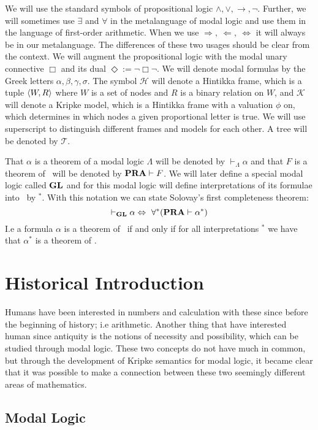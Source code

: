 \documentclass[../main.tex]{subfiles}
\begin{document}
We will use the standard symbols of propositional  logic
$\wedge,\vee,\rightarrow,\neg$. Further, we will sometimes use $\exists$ and
$\forall$ in the metalanguage of modal logic and use them in the language of
first-order arithmetic. When we use $\Rightarrow,\ \Leftarrow, \
\Leftrightarrow$ it will always be in our metalanguage. The differences of these two usages should be clear
from the context. We will augment the propositional logic with the modal unary
connective $\Box$ and its dual $\Diamond:=\neg\Box\neg$. We will denote modal
formulas by the Greek letters $\alpha,\beta,\gamma,\sigma$. The symbol
$\mathcal{H}$ will denote a
Hintikka frame,  which is a tuple $\langle W,R\rangle$ where $W$ is a set of nodes and
$R$ is a binary relation on $W$, and
$\mathcal{K}$ will denote a Kripke model, which is a Hintikka frame with a
valuation $\phi$ on, which determines in which nodes a given proportional letter
is true. We will use superscript to distinguish different frames
and models for each other.
A tree will be denoted by $\mathcal{T}$.

That $\alpha$ is a theorem of a modal logic $\Lambda$ will be denoted by
$\vdash_\Lambda\alpha$ and that $F$ is a theorem of \PRA\ will be denoted by
$\text{\textbf{PRA}}\vdash F$. We will later define a special modal logic called $\text{\textbf{GL}}$ and for
this modal logic will define interpretations of its formulae into \PRA\ by
$^*$. With this notation we can state Solovay's first completeness theorem:
\[\vdash_{\text{\textbf{GL}}}\alpha\Leftrightarrow\ \forall ^*(\text{\textbf{PRA}}\vdash\alpha^*)\]
I.e a formula $\alpha$ is a theorem of \GL\ if and only if for all
interpretations $^*$ we have that $\alpha^*$ is a theorem of \PRA.

\section{Historical Introduction}
Humans have been interested in numbers and calculation with these since before
the beginning of history; i.e arithmetic. Another thing that have interested
human since antiquity is the notions of necessity and possibility, which can be
studied through modal logic. These two
concepts do not have much in common, but through the development of Kripke
semantics for modal logic, it became clear that it was possible to make a
connection between these two seemingly different areas of mathematics.

\subsection{Modal Logic}
\end{document}
